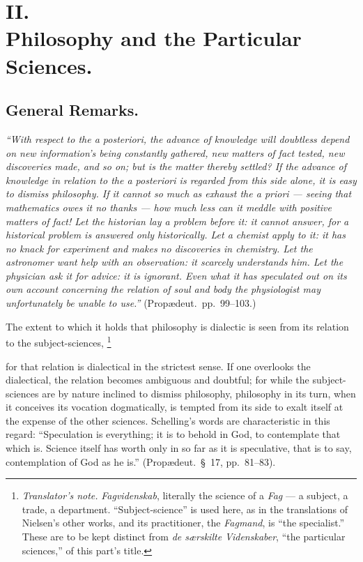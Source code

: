 \documentclass[12pt,a4paper]{book}
\renewcommand{\thefootnote}{\ifcase\value{footnote}\or *)\or **)\or ***)\fi}
\newcommand{\tnote}[1]{%
  \begingroup
  \renewcommand{\thefootnote}{\textdagger}%
  \footnote{\emph{Translator's note.} #1}%
  \addtocounter{footnote}{-1}%
  \endgroup}
\begin{document}
\chapter*{II.\\ Philosophy and the Particular Sciences.}

\section*{General Remarks.}

\emph{``With respect to the \textit{a posteriori}, the advance of knowledge
will doubtless depend on new information's being constantly gathered, new
matters of fact tested, new discoveries made, and so on; but is the matter
thereby settled? If the advance of knowledge in relation to the \textit{a
posteriori} is regarded from this side alone, it is easy to dismiss philosophy.
If it cannot so much as exhaust the \textit{a priori} --- seeing that
mathematics owes it no thanks --- how much less can it meddle with positive
matters of fact! Let the historian lay a problem before it: it cannot answer,
for a historical problem is answered
only historically. Let a chemist apply to it: it has no
knack for experiment and makes no discoveries in chemistry. Let the astronomer
want help with an observation: it scarcely understands him. Let the physician
ask it for advice: it is ignorant. Even what it has speculated out on its own
account concerning the relation of soul and body the physiologist may
unfortunately be unable to use.''} (Propædeut.\ pp.~99--103.)

The extent to which it holds that philosophy is dialectic is seen from its
relation to the subject-sciences,\tnote{\emph{Fagvidenskab}, literally the
science of a \emph{Fag} --- a subject, a trade, a department.
``Subject-science'' is used here, as in the translations of Nielsen's other
works, and its practitioner, the \emph{Fagmand}, is ``the specialist.'' These
are to be kept distinct from \emph{de særskilte Videnskaber}, ``the particular
sciences,'' of this part's title.} for that relation is dialectical in the
strictest sense. If one overlooks the dialectical, the relation becomes
ambiguous and doubtful; for while the subject-sciences are by nature inclined
to dismiss philosophy, philosophy in its turn, when it conceives its vocation
dogmatically, is tempted from its side to exalt itself at the expense of the
other sciences. Schelling's words are characteristic in this regard:
``Speculation is everything; it is to behold in God, to contemplate that which
is. Science itself has worth only in so far as it is speculative, that is to
say, contemplation of God as he is.'' (Propædeut.\ §~17, pp.~81--83).
\end{document}

